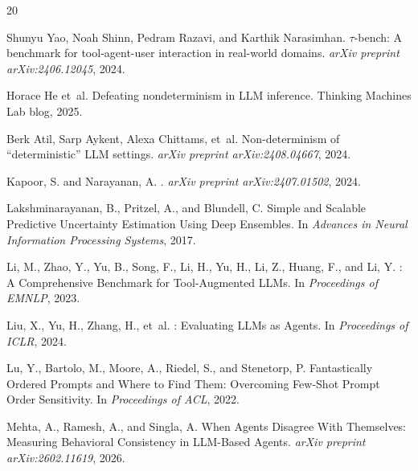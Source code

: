 \documentclass[11pt]{article}
\begin{document}
\begin{thebibliography}{20}

Shunyu Yao, Noah Shinn, Pedram Razavi, and Karthik Narasimhan.
\newblock $\tau$-bench: A benchmark for tool-agent-user interaction in
  real-world domains.
\newblock \emph{arXiv preprint arXiv:2406.12045}, 2024.

Horace He et~al.
\newblock Defeating nondeterminism in {LLM} inference.
\newblock Thinking Machines Lab blog, 2025.

Berk Atil, Sarp Aykent, Alexa Chittams, et~al.
\newblock Non-determinism of ``deterministic'' {LLM} settings.
\newblock \emph{arXiv preprint arXiv:2408.04667}, 2024.

Kapoor, S. and Narayanan, A.
.
\newblock \textit{arXiv preprint arXiv:2407.01502}, 2024.

Lakshminarayanan, B., Pritzel, A., and Blundell, C.
\newblock Simple and Scalable Predictive Uncertainty Estimation Using Deep
  Ensembles.
\newblock In \textit{Advances in Neural Information Processing Systems}, 2017.

Li, M., Zhao, Y., Yu, B., Song, F., Li, H., Yu, H., Li, Z., Huang, F., and
  Li, Y.
: A Comprehensive Benchmark for Tool-Augmented {LLMs}.
\newblock In \textit{Proceedings of EMNLP}, 2023.

Liu, X., Yu, H., Zhang, H., et~al.
: Evaluating {LLMs} as Agents.
\newblock In \textit{Proceedings of ICLR}, 2024.

Lu, Y., Bartolo, M., Moore, A., Riedel, S., and Stenetorp, P.
\newblock Fantastically Ordered Prompts and Where to Find Them: Overcoming
  Few-Shot Prompt Order Sensitivity.
\newblock In \textit{Proceedings of ACL}, 2022.

Mehta, A., Ramesh, A., and Singla, A.
\newblock When Agents Disagree With Themselves: Measuring Behavioral
  Consistency in {LLM}-Based Agents.
\newblock \textit{arXiv preprint arXiv:2602.11619}, 2026.


\end{thebibliography}
\end{document}
